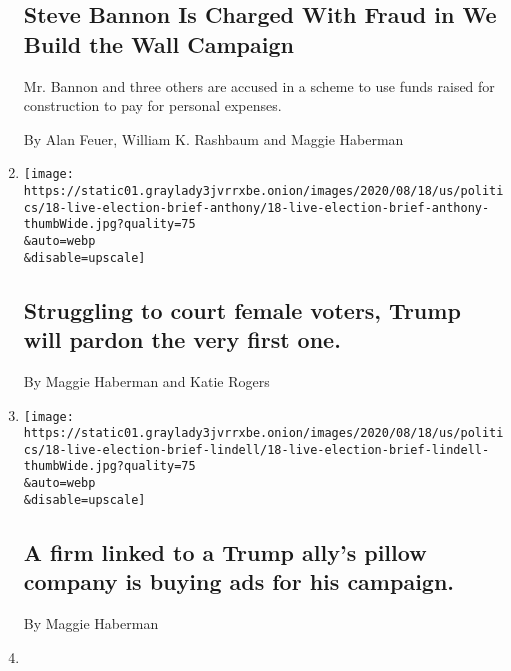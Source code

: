 \begin{enumerate}
{  \subsection{Steve Bannon Is Charged With Fraud in We Build the Wall
  Campaign}\label{steve-bannon-is-charged-with-fraud-in-we-build-the-wall-campaign}}

  Mr. Bannon and three others are accused in a scheme to use funds
  raised for construction to pay for personal expenses.

  By Alan Feuer, William K. Rashbaum and Maggie Haberman
\item
  \href{/2020/08/18/us/elections/struggling-to-court-female-voters-trump-will-pardon-the-very-first-one.html}{}

  \texttt{[image: https://static01.graylady3jvrrxbe.onion/images/2020/08/18/us/politics/18-live-election-brief-anthony/18-live-election-brief-anthony-thumbWide.jpg?quality=75\\\&auto=webp\\\&disable=upscale]}

  \hypertarget{struggling-to-court-female-voters-trump-will-pardon-the-very-first-one}{%
  \subsection{Struggling to court female voters, Trump will pardon the
  very first
  one.}\label{struggling-to-court-female-voters-trump-will-pardon-the-very-first-one}}

  By Maggie Haberman and Katie Rogers
\item
  \href{/2020/08/18/us/elections/a-firm-linked-to-a-trump-allys-pillow-company-is-buying-ads-for-his-campaign.html}{}

  \texttt{[image: https://static01.graylady3jvrrxbe.onion/images/2020/08/18/us/politics/18-live-election-brief-lindell/18-live-election-brief-lindell-thumbWide.jpg?quality=75\\\&auto=webp\\\&disable=upscale]}

  \hypertarget{a-firm-linked-to-a-trump-allys-pillow-company-is-buying-ads-for-his-campaign}{%
  \subsection{A firm linked to a Trump ally's pillow company is buying
  ads for his
  campaign.}\label{a-firm-linked-to-a-trump-allys-pillow-company-is-buying-ads-for-his-campaign}}

  By Maggie Haberman
\item
  \href{/2020/08/18/us/politics/trump-susan-b-anthony-pardon.html}{}


\end{enumerate}
